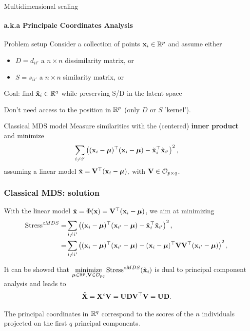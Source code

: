 \documentclass{beamer}\usepackage[]{graphicx}\usepackage[]{color}
\begin{document}
\begin{frame}{Multidimensional scaling}
  \framesubtitle{a.k.a Principale Coordinates Analysis}

  \begin{block}{Problem setup}
  Consider a collection of points $\mathbf{x}_i\in\mathbb{R}^p$ and assume either 
  \begin{itemize}
  \item $D = d_{ii'}$ a $n\times n$ dissimilarity matrix, or
  \item $S = s_{ii'}$ a $n\times n$ similarity matrix, or
  \end{itemize}
  \alert{Goal:} find $\tilde{\mathbf{x}}_i\in\mathbb{R}^q$ while preserving S/D in the latent space\\
  \end{block}
  
  \rsa Don't need access to the position in $\mathbb{R}^p$ (only $D$ or $S$ \rsa 'kernel').


  \begin{block}{Classical MDS model}
    Measure similarities with the (centered) \alert{\bf inner product} and minimize 
    \begin{equation*}
      \sum_{i\neq i'} \left( (\mathbf{x}_i - \boldsymbol{\mu})^\top (\mathbf{x}_i - \boldsymbol{\mu}) - \tilde{\mathbf{x}}_i^\top \tilde{\mathbf{x}}_{i'} \right)^2,
    \end{equation*}
    assuming a linear model $\tilde{\mathbf{x}} =  \mathbf{V}^\top (\mathbf{x}_i - \boldsymbol{\mu})$, with $\mathbf{V} \in \mathcal{O}_{p \times q}$.  \end{block}

\end{frame}

\begin{frame}
  \frametitle{Classical MDS: solution}

  With the linear model $\tilde{\mathbf{x}} = \Phi(\mathbf{x}) = \mathbf{V}^\top (\mathbf{x}_i - \boldsymbol{\mu})$, we aim at minimizing
  \begin{align*}
    \text{Stress}^{cMDS} = & \sum_{i\neq i'}  \left( (\mathbf{x}_i - \boldsymbol{\mu})^\top (\mathbf{x}_{i'} - \boldsymbol{\mu}) - \tilde{\mathbf{x}}_i^\top \tilde{\mathbf{x}}_{i'} \right)^2, \\
    = & \sum_{i\neq i'} \left( (\mathbf{x}_i - \boldsymbol{\mu})^\top (\mathbf{x}_{i'} - \boldsymbol{\mu}) -  (\mathbf{x}_i - \boldsymbol{\mu})^\top \mathbf{V} \mathbf{V}^\top (\mathbf{x}_{i'} - \boldsymbol{\mu}) \right)^2,
    \end{align*}

  It can be showed that  $\displaystyle \mathop{\mathrm{minimize}}_{\boldsymbol{\mu}\in\mathbb{R}^p, \mathbf{V}\in\mathcal{O}_{pq}} \text{Stress}^{cMDS}(\tilde{\mathbf{x}}_i)$ is dual to principal component analysis and leads to
  \[
    \tilde{\mathbf{X}} = \mathbf{X}^c \mathbf{V} = \mathbf{U}\mathbf{D}\mathbf{V}^\top \mathbf{V} = \mathbf{U}\mathbf{D}.
  \]
  
  \alert{\rsa The principal coordinates in $\mathbb{R}^q$ correspond to the scores of the $n$ individuals projected on the first $q$ principal components.}
\end{frame}
\end{document}
